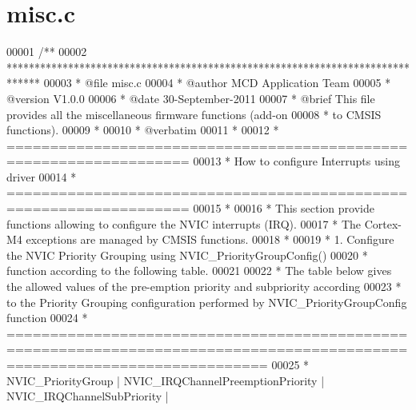 \section{misc.\+c}
\label{misc_8c_source}

\begin{DoxyCode}
00001 \textcolor{comment}{/**}
00002 \textcolor{comment}{  ******************************************************************************}
00003 \textcolor{comment}{  * @file    misc.c}
00004 \textcolor{comment}{  * @author  MCD Application Team}
00005 \textcolor{comment}{  * @version V1.0.0}
00006 \textcolor{comment}{  * @date    30-September-2011}
00007 \textcolor{comment}{  * @brief   This file provides all the miscellaneous firmware functions (add-on}
00008 \textcolor{comment}{  *          to CMSIS functions).}
00009 \textcolor{comment}{  *          }
00010 \textcolor{comment}{  *  @verbatim   }
00011 \textcolor{comment}{  *                               }
00012 \textcolor{comment}{  *          ===================================================================      }
00013 \textcolor{comment}{  *                        How to configure Interrupts using driver }
00014 \textcolor{comment}{  *          ===================================================================      }
00015 \textcolor{comment}{  * }
00016 \textcolor{comment}{  *            This section provide functions allowing to configure the NVIC interrupts (IRQ).}
00017 \textcolor{comment}{  *            The Cortex-M4 exceptions are managed by CMSIS functions.}
00018 \textcolor{comment}{  *}
00019 \textcolor{comment}{  *            1. Configure the NVIC Priority Grouping using NVIC\_PriorityGroupConfig()}
00020 \textcolor{comment}{  *                function according to the following table.}
00021 \textcolor{comment}{ }
00022 \textcolor{comment}{  *  The table below gives the allowed values of the pre-emption priority and subpriority according}
00023 \textcolor{comment}{  *  to the Priority Grouping configuration performed by NVIC\_PriorityGroupConfig function}
00024 \textcolor{comment}{  *   
       ==========================================================================================================================}
00025 \textcolor{comment}{  *      NVIC\_PriorityGroup   | NVIC\_IRQChannelPreemptionPriority | NVIC\_IRQChannelSubPriority  |     
}
\end{DoxyCode}
